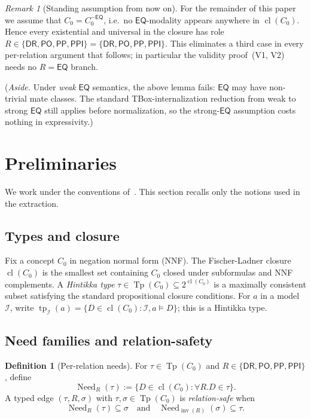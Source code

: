 \documentclass[11pt]{article}
\theoremstyle{definition}
\newtheorem{definition}[theorem]{Definition}
\theoremstyle{remark}
\newtheorem{remark}[theorem]{Remark}
\newcommand{\DR}{\mathsf{DR}}
\newcommand{\PO}{\mathsf{PO}}
\newcommand{\PP}{\mathsf{PP}}
\newcommand{\PPI}{\mathsf{PPI}}
\newcommand{\EQ}{\mathsf{EQ}}
\newcommand{\BaseEdge}{\{\DR,\PO,\PP,\PPI\}}
\newcommand{\cl}{\operatorname{cl}}
\newcommand{\Tp}{\operatorname{Tp}}
\newcommand{\tp}{\operatorname{tp}}
\newcommand{\inv}{\operatorname{inv}}
\newcommand{\Need}{\operatorname{Need}}
\begin{document}
\begin{remark}[Standing assumption from now on]
\label{rem:eq-stripped}
For the remainder of this paper we assume that $C_0 = C_0^{-\EQ}$,
i.e.\ no $\EQ$-modality appears anywhere in $\cl(C_0)$.  Hence every
existential and universal in the closure has role
$R \in \BaseEdge = \{\DR,\PO,\PP,\PPI\}$.  This eliminates a third
case in every per-relation argument that follows; in particular the
validity proof~(V1, V2) needs no $R=\EQ$ branch.

(\emph{Aside.}\; Under \emph{weak} $\EQ$ semantics, the above
lemma fails: $\EQ$ may have non-trivial mate classes.  The standard
TBox-internalization reduction from weak to strong $\EQ$ still
applies before normalization, so the strong-$\EQ$ assumption costs
nothing in expressivity.)
\end{remark}


\section{Preliminaries}
\label{sec:prelim}

We work under the conventions of~\cite{SplitForest}.  This section
recalls only the notions used in the extraction.

\subsection{Types and closure}

Fix a concept $C_0$ in negation normal form (NNF).  The
Fischer-Ladner closure $\cl(C_0)$ is the smallest set containing
$C_0$ closed under subformulas and NNF complements.  A
\emph{Hintikka type} $\tau \in \Tp(C_0) \subseteq 2^{\cl(C_0)}$ is
a maximally consistent subset satisfying the standard propositional
closure conditions.  For $a$ in a model $\mathcal{I}$, write
$\tp_{\mathcal{I}}(a) = \{D \in \cl(C_0) : \mathcal{I},a\models D\}$;
this is a Hintikka type.

\subsection{Need families and relation-safety}

\begin{definition}[Per-relation needs]\label{def:need}
For $\tau \in \Tp(C_0)$ and $R \in \BaseEdge$, define
\[
\Need_R(\tau) := \{D \in \cl(C_0) : \forall R.D \in \tau\}.
\]
A typed edge $(\tau, R, \sigma)$ with $\tau,\sigma\in\Tp(C_0)$ is
\emph{relation-safe} when
\[
\Need_R(\tau) \subseteq \sigma
\quad\text{and}\quad
\Need_{\inv(R)}(\sigma) \subseteq \tau.
\]
\end{definition}
\end{document}
